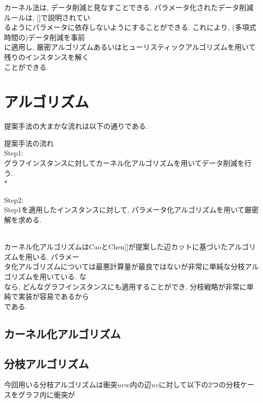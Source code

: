 \documentclass[10.5,a4paper,titlepage]{bxjsarticle}
\begin{document}
カーネル法は, データ削減と見なすことできる.
パラメータ化されたデータ削減ルールは, []で説明されてい\\

るようにパラメータに依存しないようにすることができる.
これにより, (多項式時間の)データ削減を事前\\

に適用し, 厳密アルゴリズムあるいはヒューリスティックアルゴリズムを用いて残りのインスタンスを解く\\

ことができる.
\section{アルゴリズム}
提案手法の大まかな流れは以下の通りである.\\

\begin{screen}
    提案手法の流れ \\

    Step1: \\

    \hspace{15pt} グラフインスタンスに対してカーネル化アルゴリズムを用いてデータ削減を行う. \\*

    Step2: \\

    \hspace{15pt} Step1を適用したインスタンスに対して, パラメータ化アルゴリズムを用いて厳密解を求める.

\end{screen}
\\

カーネル化アルゴリズムはCaoとChen[]が提案した辺カットに基づいたアルゴリズムを用いる. パラメー\\

タ化アルゴリズムについては最悪計算量が最良ではないが非常に単純な分枝アルゴリズムを用いている.
な\\

なら, どんなグラフインスタンスにも適用することができ, 分枝戦略が非常に単純で実装が容易であるから\\

である.
\subsection{カーネル化アルゴリズム}
\subsection{分枝アルゴリズム}
今回用いる分枝アルゴリズムは衝突$uvw$内の辺$uv$に対して以下の2つの分枝ケースをグラフ内に衝突が\\
\end{document}
